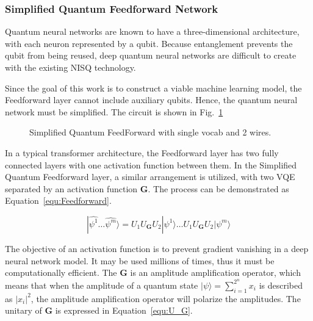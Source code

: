 \subsubsection{Simplified Quantum Feedforward Network}

Quantum neural networks are known to have a three-dimensional architecture, with each neuron represented by a qubit. Because entanglement prevents the qubit from being reused, deep quantum neural networks are difficult to create with the existing NISQ technology.

Since the goal of this work is to construct a viable machine learning model, the Feedforward layer cannot include auxiliary qubits. Hence, the quantum neural network must be simplified. The circuit is shown in Fig.~\ref{fig:feedforward}

\begin{figure}[htp]
  \centering
  \caption{Simplified Quantum FeedForward with single vocab and 2 wires.}
  \label{fig:feedforward}
\end{figure}

In a typical transformer architecture, the Feedforward layer has two fully connected layers with one activation function between them. In the Simplified Quantum Feedforward layer, a similar arrangement is utilized, with two VQE separated by an activation function $\mathbf{G}$. The process can be demonstrated as Equation~\ref{equ:Feedforward}.

\begin{equation} \label{equ:Feedforward}
|\hat{\psi^1}\ldots\hat{\psi^m}\rangle = U_1U_\mathbf{G}U_2|\psi^1\rangle \ldots U_1U_\mathbf{G}U_2|\psi^m\rangle
\end{equation}

The objective of an activation function is to prevent gradient vanishing in a deep neural network model. It may be used millions of times, thus it must be computationally efficient.
The $\mathbf{G}$ is an amplitude amplification operator, which means that when the amplitude of a quantum state $|\psi\rangle = \sum^{2^{n}}_{i=1} x_i$ is described as $|x_i|^2$, the amplitude amplification operator will polarize the amplitudes. The unitary of $\mathbf{G}$ is expressed in Equation~\ref{equ:U_G}.


